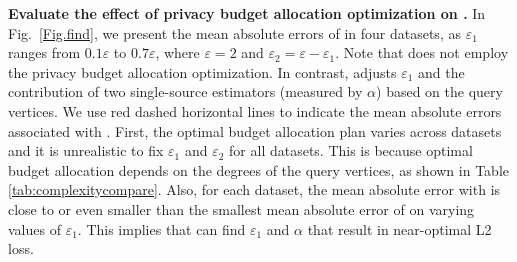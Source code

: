 
\noindent
\textbf{Evaluate the effect of privacy budget allocation optimization on \advds. }
In Fig.~\ref{Fig.find}, we present the mean absolute errors of \advdsbasic in four datasets, as $\varepsilon_1$ ranges from $0.1 \varepsilon$ to $0.7 \varepsilon$, where $\varepsilon = 2$  and $\varepsilon_2 = \varepsilon - \varepsilon_1$. 
Note that \advdsbasic does not employ the privacy budget allocation optimization. 
In contrast, \advds adjusts $\varepsilon_1$ and the contribution of two single-source estimators (measured by $\alpha$) based on the query vertices. 
We use red dashed horizontal lines to indicate the mean absolute errors associated with \advds. 
First, the optimal budget allocation plan varies across datasets and it is unrealistic to fix $\varepsilon_1$ and $\varepsilon_2$ for all datasets. 
This is because optimal budget allocation depends on the degrees of the query vertices, as shown in Table \ref{tab:complexitycompare}. 
Also, for each dataset, the mean absolute error with \advds is close to or even smaller than the smallest mean absolute error of \advdsbasic on varying values of $\varepsilon_1$. 
This implies that \advds can find $\varepsilon_1$ and $\alpha$ that result in near-optimal L2 loss. 


